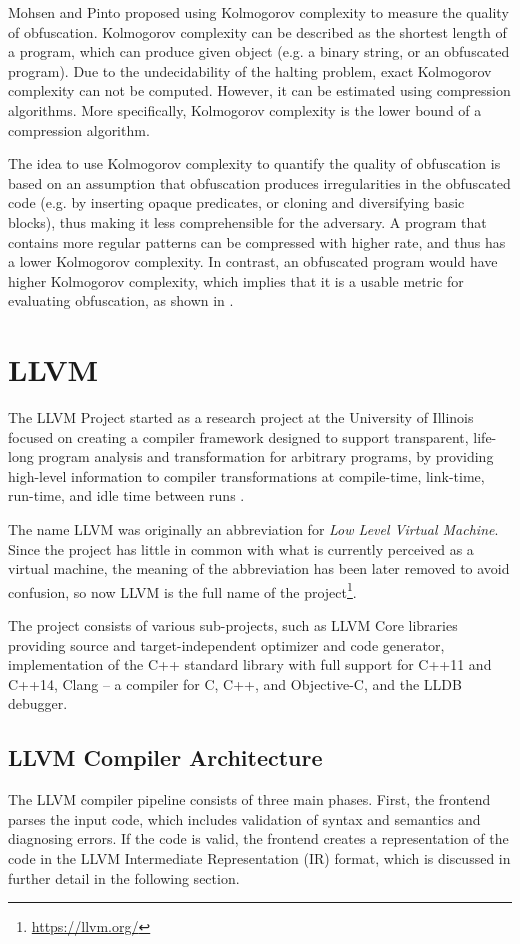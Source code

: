 \documentclass[
  digital, %
  notable,   %
  twoside, %
  nolof,     %
  nolot,     %
]{fithesis3}
\theoremstyle{definition}
\begin{document}
Mohsen and Pinto \cite{eval2016} proposed using Kolmogorov complexity \cite{Kolmogorov1998} to measure the quality of obfuscation. Kolmogorov complexity can be described as the shortest length of a program, which can produce given object (e.g. a binary string, or an obfuscated program). Due to the undecidability of the halting problem, exact Kolmogorov complexity can not be computed. However, it can be estimated using compression algorithms. More specifically, Kolmogorov complexity is the lower bound of a compression algorithm.  

The idea to use Kolmogorov complexity to quantify the quality of obfuscation is based on an assumption that obfuscation produces irregularities in the obfuscated code (e.g. by inserting opaque predicates, or cloning and  diversifying basic blocks), thus making it less comprehensible for the adversary. A program that contains more regular patterns can be compressed with higher rate, and thus has a lower Kolmogorov complexity. In contrast, an obfuscated program would have higher Kolmogorov complexity, which implies that it is a usable metric for evaluating obfuscation, as shown in \cite{Kolmogorov1998}. 

\chapter{LLVM} \label{chap:llvm}

The LLVM Project started as a research project at the University of Illinois focused on creating a compiler framework designed to support transparent, life-long program analysis and transformation for arbitrary programs, by providing high-level information to compiler transformations at compile-time, link-time, run-time, and idle time between runs \cite{llvm_orig}. 

The name LLVM was originally an abbreviation for \textit{Low Level Virtual Machine}. Since the project has little in common with what is currently perceived as a virtual machine, the meaning of the abbreviation has been later removed to avoid confusion, so now LLVM is the full name of the project\footnote{\url{https://llvm.org/}}.

The project consists of various sub-projects, such as LLVM Core libraries providing source and target-independent optimizer and code generator, implementation of the C++ standard library with full support for C++11 and C++14, Clang -- a compiler for C, C++, and Objective-C, and the LLDB debugger.

\section{LLVM Compiler Architecture}
The LLVM compiler pipeline consists of three main phases. First, the frontend parses the input code, which includes validation of syntax and semantics and diagnosing errors. If the code is valid, the frontend creates a representation of the code in the LLVM Intermediate Representation (IR) format, which is discussed in further detail in the following section. 
\end{document}
